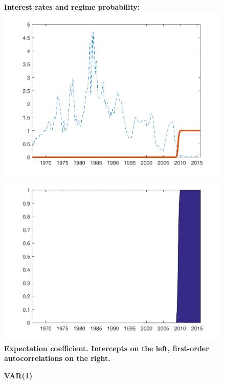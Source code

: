 \documentclass[12pt,reqno]{article}
\numberwithin{equation}{section}
\begin{document}
\begin{figure}[H]
\caption{\large{\textbf{VAR(1)}}}
\vspace{5 mm}

\textbf{Interest rates and regime probability:} \\

\includegraphics[scale=0.6]{NKPC_filter_init_VAR1_regime.pdf}
\includegraphics[scale=0.6]{NKPC_filter_init_VAR1_regimeProb.pdf}\\

\textbf{Expectation coefficient. Intercepts on the left, first-order autocorrelations on the right.}\\


\end{figure}
\end{document}
